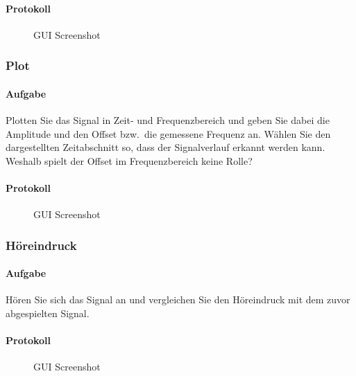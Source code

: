 \documentclass[10pt]{report}
\begin{document}
        \paragraph{Protokoll}
        \begin{center}
            \begin{figure}[H]
              \caption{GUI Screenshot}
            \end{figure}
        \end{center}

        \subsubsection{Plot}
        \paragraph{Aufgabe}
        Plotten Sie das Signal in Zeit- und Frequenzbereich und geben Sie dabei die Amplitude
        und den Offset bzw.\ die gemessene Frequenz an. Wählen Sie den dargestellten
        Zeitabschnitt so, dass der Signalverlauf erkannt werden kann. Weshalb spielt der
        Offset im Frequenzbereich keine Rolle?
        \paragraph{Protokoll}
        \begin{center}
            \begin{figure}[H]
              \caption{GUI Screenshot}
            \end{figure}
        \end{center}

        \subsubsection{Höreindruck}
        \paragraph{Aufgabe}
        Hören Sie sich das Signal an und vergleichen Sie den Höreindruck mit dem zuvor
        abgespielten Signal.
        \paragraph{Protokoll}
        \begin{center}
            \begin{figure}[H]
              \caption{GUI Screenshot}
            \end{figure}
        \end{center}
\end{document}
